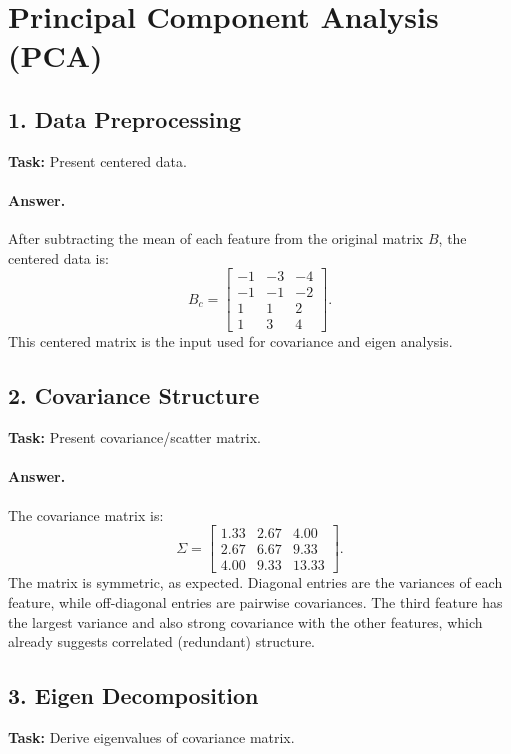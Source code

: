 \section{Principal Component Analysis (PCA)}

\subsection{1. Data Preprocessing}
\textbf{Task:} Present centered data.

\paragraph{Answer.}
After subtracting the mean of each feature from the original matrix \(B\), the centered data is:
\[
B_c=
\begin{bmatrix}
-1 & -3 & -4\\
-1 & -1 & -2\\
 1 &  1 &  2\\
 1 &  3 &  4
\end{bmatrix}.
\]
This centered matrix is the input used for covariance and eigen analysis.

\subsection{2. Covariance Structure}
\textbf{Task:} Present covariance/scatter matrix.

\paragraph{Answer.}
The covariance matrix is:
\[
\Sigma=
\begin{bmatrix}
1.33 & 2.67 & 4.00\\
2.67 & 6.67 & 9.33\\
4.00 & 9.33 & 13.33
\end{bmatrix}.
\]
The matrix is symmetric, as expected. Diagonal entries are the variances of each feature, while off-diagonal entries are pairwise covariances. The third feature has the largest variance and also strong covariance with the other features, which already suggests correlated (redundant) structure.

\subsection{3. Eigen Decomposition}
\textbf{Task:} Derive eigenvalues of covariance matrix.

